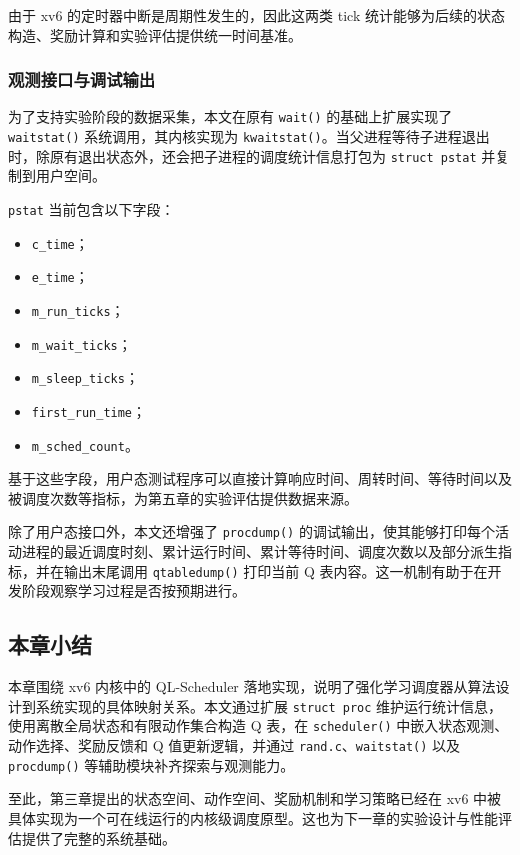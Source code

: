 由于 xv6 的定时器中断是周期性发生的，因此这两类 tick 统计能够为后续的状态构造、奖励计算和实验评估提供统一时间基准。

\subsubsection{观测接口与调试输出}

为了支持实验阶段的数据采集，本文在原有 \texttt{wait()} 的基础上扩展实现了 \texttt{waitstat()} 系统调用，其内核实现为 \texttt{kwaitstat()}。当父进程等待子进程退出时，除原有退出状态外，还会把子进程的调度统计信息打包为 \texttt{struct pstat} 并复制到用户空间。

\texttt{pstat} 当前包含以下字段：

\begin{itemize}
\item \texttt{c\_time}；
\item \texttt{e\_time}；
\item \texttt{m\_run\_ticks}；
\item \texttt{m\_wait\_ticks}；
\item \texttt{m\_sleep\_ticks}；
\item \texttt{first\_run\_time}；
\item \texttt{m\_sched\_count}。
\end{itemize}

基于这些字段，用户态测试程序可以直接计算响应时间、周转时间、等待时间以及被调度次数等指标，为第五章的实验评估提供数据来源。

除了用户态接口外，本文还增强了 \texttt{procdump()} 的调试输出，使其能够打印每个活动进程的最近调度时刻、累计运行时间、累计等待时间、调度次数以及部分派生指标，并在输出末尾调用 \texttt{qtabledump()} 打印当前 Q 表内容。这一机制有助于在开发阶段观察学习过程是否按预期进行。

\subsection{本章小结}

本章围绕 xv6 内核中的 QL-Scheduler 落地实现，说明了强化学习调度器从算法设计到系统实现的具体映射关系。本文通过扩展 \texttt{struct proc} 维护运行统计信息，使用离散全局状态和有限动作集合构造 Q 表，在 \texttt{scheduler()} 中嵌入状态观测、动作选择、奖励反馈和 Q 值更新逻辑，并通过 \texttt{rand.c}、\texttt{waitstat()} 以及 \texttt{procdump()} 等辅助模块补齐探索与观测能力。

至此，第三章提出的状态空间、动作空间、奖励机制和学习策略已经在 xv6 中被具体实现为一个可在线运行的内核级调度原型。这也为下一章的实验设计与性能评估提供了完整的系统基础。
